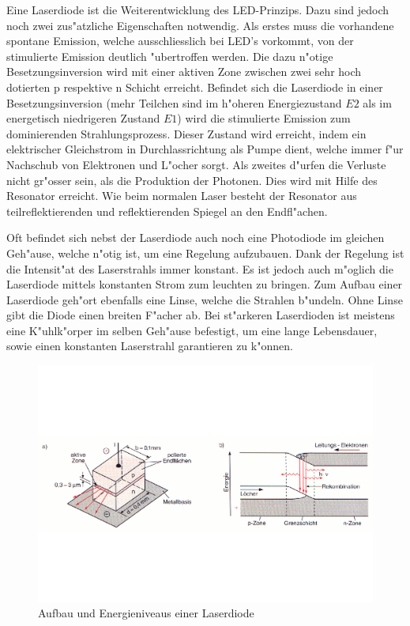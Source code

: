 \begin{refsection}
Eine Laserdiode ist die Weiterentwicklung des LED-Prinzips. Dazu sind jedoch 
noch zwei zus"atzliche Eigenschaften notwendig. Als erstes muss die vorhandene 
spontane Emission, welche ausschliesslich bei LED's vorkommt, von der 
stimulierte Emission deutlich "ubertroffen werden. Die dazu n"otige 
Besetzungsinversion wird mit einer aktiven Zone zwischen zwei sehr hoch 
dotierten p respektive n Schicht erreicht. Befindet sich die Laserdiode in 
einer Besetzungsinversion (mehr Teilchen sind im h"oheren Energiezustand $E2$ 
als im energetisch niedrigeren Zustand $E1$) wird die stimulierte Emission zum 
dominierenden Strahlungsprozess. Dieser Zustand wird erreicht, indem ein 
elektrischer Gleichstrom in Durchlassrichtung als Pumpe dient, welche immer 
f"ur Nachschub von Elektronen und L"ocher sorgt. Als zweites d"urfen die 
Verluste nicht gr"osser sein, als die Produktion der Photonen.
Dies wird mit Hilfe des Resonator erreicht.
Wie beim normalen Laser besteht der Resonator aus teilreflektierenden 
und reflektierenden Spiegel an den Endfl"achen.

Oft befindet sich nebst der Laserdiode auch noch eine Photodiode im gleichen 
Geh"ause, welche n"otig ist, um eine Regelung aufzubauen. Dank der Regelung 
ist die Intensit"at des Laserstrahls immer konstant. Es ist jedoch auch 
m"oglich die Laserdiode mittels konstanten Strom zum leuchten zu bringen. Zum 
Aufbau einer Laserdiode geh"ort ebenfalls eine Linse, welche die Strahlen 
b"undeln. Ohne Linse gibt die Diode einen breiten F"acher ab. Bei st"arkeren 
Laserdioden ist meistens eine K"uhlk"orper im selben Geh"ause befestigt, um 
eine lange Lebensdauer, sowie einen konstanten Laserstrahl garantieren zu 
k"onnen. 
\begin{figure}
\centering
\includegraphics[scale=0.35]{laser/bilder/laserdiodeb.pdf}
\caption{Aufbau und Energieniveaus einer Laserdiode \cite{halbleiterlaser}}
\label{fig:Laserdiode}
\end{figure}


\end{refsection}
